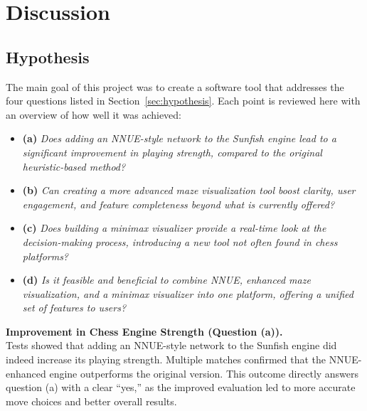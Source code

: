 \documentclass[12pt,a4paper]{article}
\begin{document}
\section{Discussion}
\subsection{Hypothesis}

The main goal of this project was to create a software tool that addresses the
four questions listed in Section~\ref{sec:hypothesis}. Each point is reviewed
here with an overview of how well it was achieved:

\begin{itemize}[label={}, leftmargin=1em]

\item \textbf{(a)} \textit{Does adding an NNUE-style network to the Sunfish engine
lead to a significant improvement in playing strength, compared to the original
heuristic-based method?}

\item \textbf{(b)} \textit{Can creating a more advanced maze visualization tool
boost clarity, user engagement, and feature completeness beyond what is
currently offered?}

\item \textbf{(c)} \textit{Does building a minimax visualizer provide a real-time
look at the decision-making process, introducing a new tool not often found in
chess platforms?}

\item \textbf{(d)} \textit{Is it feasible and beneficial to combine NNUE, enhanced
maze visualization, and a minimax visualizer into one platform, offering a
unified set of features to users?}

\end{itemize}

\vspace{0.5em}
\noindent
\textbf{Improvement in Chess Engine Strength (Question (a)).} \\
Tests showed that adding an NNUE-style network to the Sunfish engine did indeed
increase its playing strength. Multiple matches confirmed that the NNUE-enhanced
engine outperforms the original version. This outcome directly answers question (a)
with a clear ``yes,'' as the improved evaluation led to more accurate move choices
and better overall results.
\end{document}
